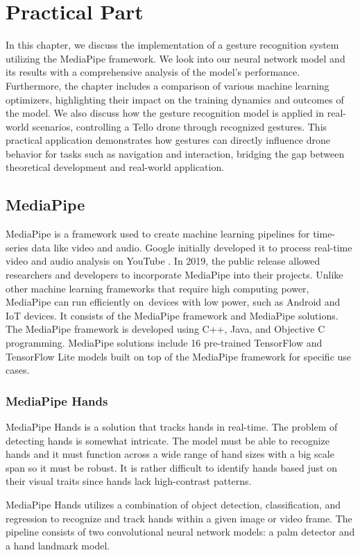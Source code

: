 \chapter{Practical Part}
In this chapter, we discuss the implementation of a gesture recognition system utilizing the MediaPipe framework. We look into our neural network model and its results with a comprehensive analysis of the model's performance. Furthermore, the chapter includes a comparison of various machine learning optimizers, highlighting their impact on the training dynamics and outcomes of the model. We also discuss how the gesture recognition model is applied in real-world scenarios, controlling a Tello drone through recognized gestures. This practical application demonstrates how gestures can directly influence drone behavior for tasks such as navigation and interaction, bridging the gap between theoretical development and real-world application.
\section{MediaPipe}
MediaPipe is a framework used to create machine learning pipelines for time-series data like video and audio. Google initially developed it to process real-time video and audio analysis on YouTube \cite{mediapipe2019blog}. In 2019, the public release allowed researchers and developers to incorporate MediaPipe into their projects. Unlike other machine learning frameworks that require high computing power, MediaPipe can run efficiently on~devices with low power, such as Android and IoT devices. It consists of the MediaPipe framework and MediaPipe solutions. The MediaPipe framework is developed using C++, Java, and Objective C programming. MediaPipe solutions include 16 pre-trained TensorFlow and TensorFlow Lite models built on top of the MediaPipe framework for specific use cases.
\subsection{MediaPipe Hands}
MediaPipe Hands is a solution that tracks hands in real-time. The problem of detecting hands is somewhat intricate. The model must be able to recognize hands and it must function across a wide range of hand sizes with a big scale span so it must be robust. It is rather difficult to identify hands based just on their visual traits since hands lack high-contrast patterns.%

MediaPipe Hands utilizes a combination of object detection, classification, and regression to recognize and track hands within a given image or video frame. The pipeline consists of two convolutional neural network models: a palm detector and a hand landmark model.


